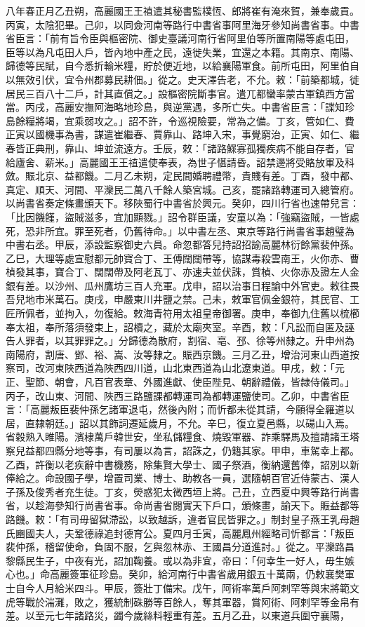 \begin{pinyinscope}
 八年春正月乙丑朔，高麗國王王禃遣其秘書監樸恆、郎將崔有淹來賀，兼奉歲貢。丙寅，太陰犯畢。己卯，以同僉河南等路行中書省事阿里海牙參知尚書省事。中書省臣言：「前有旨令臣與樞密院、御史臺議河南行省阿里伯等所置南陽等處屯田，臣等以為凡屯田人戶，皆內地中產之民，遠徙失業，宜還之本籍。其南京、南陽、歸德等民賦，自今悉折輸米糧，貯於便近地，以給襄陽軍食。前所屯田，阿里伯自以無效引伏，宜令州郡募民耕佃。」從之。史天澤告老，不允。敕：「前築都城，徙居民三百八十二戶，計其直償之。」設樞密院斷事官。遣兀都蠻率蒙古軍鎮西方當當。丙戌，高麗安撫阿海略地珍島，與逆黨遇，多所亡失。中書省臣言：「諜知珍島餘糧將竭，宜乘弱攻之。」詔不許，令巡視險要，常為之備。丁亥，管如仁、費正寅以國機事為書，謀遣崔繼春、賈靠山、路坤入宋，事覺窮治，正寅、如仁、繼春皆正典刑，靠山、坤並流遠方。壬辰，敕：「諸路鰥寡孤獨疾病不能自存者，官給廬舍、薪米。」高麗國王王禃遣使奉表，為世子愖請昏。詔禁邊將受賂放軍及科斂。賑北京、益都饑。二月乙未朔，定民間婚聘禮幣，貴賤有差。丁酉，發中都、真定、順天、河間、平灤民二萬八千餘人築宮城。己亥，罷諸路轉運司入總管府。以尚書省奏定條畫頒天下。移陜蜀行中書省於興元。癸卯，四川行省也速帶兒言：「比因饑饉，盜賊滋多，宜加顯戮。」詔令群臣議，安童以為：「強竊盜賊，一皆處死，恐非所宜。罪至死者，仍舊待命。」以中書左丞、東京等路行尚書省事趙璧為中書右丞。甲辰，添設監察御史六員。命忽都答兒持詔招諭高麗林衍餘黨裴仲孫。乙巳，大理等處宣慰都元帥寶合丁、王傅闊闊帶等，協謀毒殺雲南王，火你赤、曹楨發其事，寶合丁、闊闊帶及阿老瓦丁、亦速夫並伏誅，賞楨、火你赤及證左人金銀有差。以沙州、瓜州鷹坊三百人充軍。戊申，詔以治事日程諭中外官吏。敕往畏吾兒地市米萬石。庚戌，申嚴東川井鹽之禁。己未，敕軍官佩金銀符，其民官、工匠所佩者，並拘入，勿復給。敕海青符用太祖皇帝御署。庚申，奉御九住舊以梳櫛奉太祖，奉所落須發束上，詔櫝之，藏於太廟夾室。辛酉，敕：「凡訟而自匿及誣告人罪者，以其罪罪之。」分歸德為散府，割宿、亳、邳、徐等州隸之。升申州為南陽府，割唐、鄧、裕、嵩、汝等隸之。賑西京饑。三月乙丑，增治河東山西道按察司，改河東陜西道為陜西四川道，山北東西道為山北遼東道。甲戌，敕：「元正、聖節、朝會，凡百官表章、外國進獻、使臣陛見、朝辭禮儀，皆隸侍儀司。」丙子，改山東、河間、陜西三路鹽課都轉運司為都轉運鹽使司。乙卯，中書省臣言：「高麗叛臣裴仲孫乞諸軍退屯，然後內附；而忻都未從其請，今願得全羅道以居，直隸朝廷。」詔以其飾詞遷延歲月，不允。辛巳，復立夏邑縣，以碭山入焉。省穀熟入睢陽。濱棣萬戶韓世安，坐私儲糧食、燒毀軍器、詐乘驛馬及擅請諸王塔察兒益都四縣分地等事，有司屢以為言，詔誅之，仍籍其家。甲申，車駕幸上都。乙酉，許衡以老疾辭中書機務，除集賢大學士、國子祭酒，衡納還舊俸，詔別以新俸給之。命設國子學，增置司業、博士、助教各一員，選隨朝百官近侍蒙古、漢人子孫及俊秀者充生徒。丁亥，熒惑犯太微西垣上將。己丑，立西夏中興等路行尚書省，以趁海參知行尚書省事。命尚書省閱實天下戶口，頒條畫，諭天下。賑益都等路饑。敕：「有司毋留獄滯訟，以致越訴，違者官民皆罪之。」制封皇子燕王乳母趙氏豳國夫人，夫鞏德祿追封德育公。夏四月壬寅，高麗鳳州經略司忻都言：「叛臣裴仲孫，稽留使命，負固不服，乞與忽林赤、王國昌分道進討。」從之。平灤路昌黎縣民生子，中夜有光，詔加鞠養。或以為非宜，帝曰：「何幸生一好人，毋生嫉心也。」命高麗簽軍征珍島。癸卯，給河南行中書省歲用銀五十萬兩，仍敕襄樊軍士自今人月給米四斗。甲辰，簽壯丁備宋。戊午，阿術率萬戶阿剌罕等與宋將範文虎等戰於湍灘，敗之，獲統制硃勝等百餘人，奪其軍器，賞阿術、阿剌罕等金帛有差。以至元七年諸路災，蠲今歲絲料輕重有差。五月乙丑，以東道兵圍守襄陽，
\end{pinyinscope}
